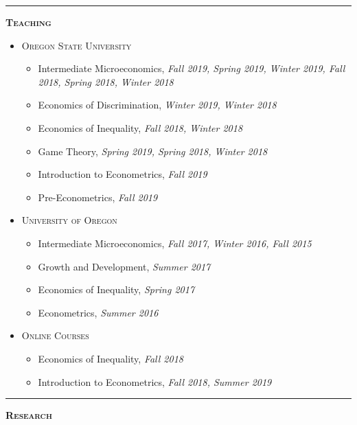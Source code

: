 \documentclass[12pt]{article}
\begin{document}
\bigskip
\hrule
\bigskip 
\noindent \textsc{\large \textbf{Teaching}}

\begin{itemize}
\item[] \textsc{Oregon State University}
\begin{itemize}[topsep=-1em, noitemsep]
\item[] Intermediate Microeconomics, \textit{Fall 2019, Spring 2019, Winter 2019, Fall 2018, Spring 2018, Winter 2018}
\item[] Economics of Discrimination, \textit{Winter 2019, Winter 2018}
\item[] Economics of Inequality, \textit{Fall 2018, Winter 2018}
\item[] Game Theory, \textit{Spring 2019, Spring 2018, Winter 2018}
\item[] Introduction to Econometrics, \textit{Fall 2019}
\item[] Pre-Econometrics, \textit{Fall 2019}      
\end{itemize}

\item[] \textsc{University of Oregon}
\begin{itemize}[topsep=-1em, noitemsep]
\item[] Intermediate Microeconomics, \textit{Fall 2017, Winter 2016, Fall 2015}
\item[] Growth and Development, \textit{Summer 2017}
\item[] Economics of Inequality, \textit{Spring 2017}
\item[] Econometrics, \textit{Summer 2016}      
\end{itemize}

\item[] \textsc{Online Courses} 
\begin{itemize}[topsep=-1em, noitemsep]
\item[] Economics of Inequality, \textit{Fall 2018}
\item[] Introduction to Econometrics, \textit{Fall 2018, Summer 2019}
\end{itemize}
\end{itemize}

\newpage

\bigskip
\hrule
\bigskip 
\noindent \textsc{\large \textbf{Research}}
\end{document}
